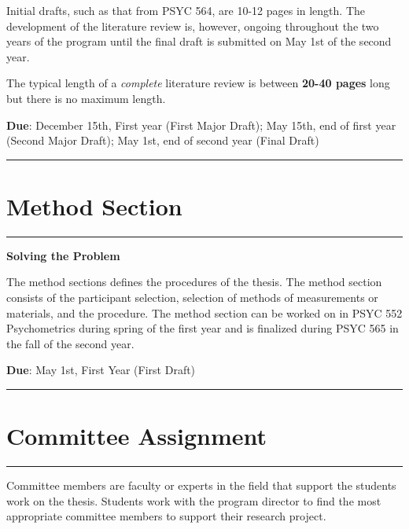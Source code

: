 \documentclass[openany]{book}
\begin{document}
Initial drafts, such as that from PSYC 564, are 10-12 pages in length. The development of the literature review is, however, ongoing throughout the two years of the program until the final draft is submitted on May 1st of the second year.

The typical length of a \emph{complete} literature review is between \textbf{20-40 pages} long but there is no maximum length.

\textbf{Due}: December 15th, First year (First Major Draft); May 15th, end of first year (Second Major Draft); May 1st, end of second year (Final Draft)

\begin{center}\rule{0.5\linewidth}{0.5pt}\end{center}

\hypertarget{method-section}{%
\section{Method Section}\label{method-section}}

\begin{center}\rule{0.5\linewidth}{0.5pt}\end{center}

\textbf{Solving the Problem}

The method sections defines the procedures of the thesis. The method section consists of the participant selection, selection of methods of measurements or materials, and the procedure. The method section can be worked on in PSYC 552 Psychometrics during spring of the first year and is finalized during PSYC 565 in the fall of the second year.

\textbf{Due}: May 1st, First Year (First Draft)

\begin{center}\rule{0.5\linewidth}{0.5pt}\end{center}

\hypertarget{committee-assignment}{%
\section{Committee Assignment}\label{committee-assignment}}

\begin{center}\rule{0.5\linewidth}{0.5pt}\end{center}

Committee members are faculty or experts in the field that support the students work on the thesis. Students work with the program director to find the most appropriate committee members to support their research project.
\end{document}

